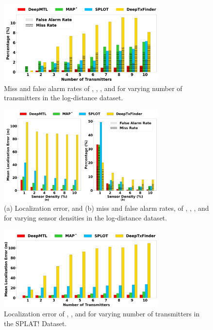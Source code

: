 \begin{figure}[t]
	\centering
	\includegraphics[width=0.75\textwidth]{chapters/wowmom-pmc/figures/log_distance-missfalse_vary_numintru.png}
    \vspace{-0.1in}
	\caption{Miss and false alarm rates of \our, \map, \splot, and \deeptx for varying number of transmitters in the log-distance dataset.}
	\label{fig:logdist-missfalse-vary-numintru}
\end{figure}


\begin{figure}[t]
	\centering
	\includegraphics[width=0.75\textwidth]{chapters/wowmom-pmc/figures/log_distance-error_missfalse_vary_sendensity.png}
    \vspace{-0.1in}
	\caption{(a) Localization error, and (b) miss and false alarm rates, of \our, \map, \splot, and \deeptx for varying sensor densities in the log-distance dataset.}
	\label{fig:logdist-error_missfalse-vary-sendensity}
\end{figure}






\begin{figure}[ht]
	\centering
	\includegraphics[width=0.75\textwidth]{chapters/wowmom-pmc/figures/splat-error_vary_numintru.png}
    \vspace{-0.1in}
	\caption{Localization error of \our, \map, \deeptx and \splot for varying number of transmitters in the SPLAT! Dataset. }
	\label{fig:splat-error-vary_numintru}
\end{figure}


